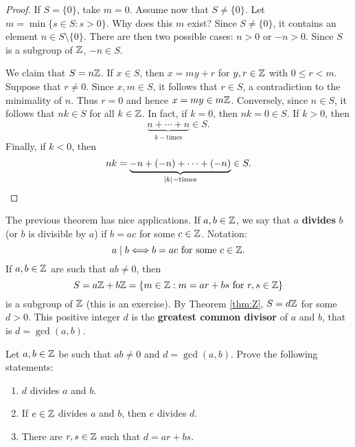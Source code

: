         \begin{proof}
                If $S=\{0\}$, take $m=0$. 
                Assume now that $S\ne\{0\}$. Let 
                $m=\min\{s\in S:s>0\}$. 
                Why does this $m$ exist?  
                Since $S\ne\{0\}$,  
                it contains 
                an element $n\in S\setminus\{0\}$. 
                There are then two possible cases: 
                $n>0$ or $-n>0$. Since 
                $S$ is a subgroup of $\mathbb{Z}$, $-n\in S$.
        
                We claim that $S=n\mathbb{Z}$.
                If $x\in S$, then $x=my+r$ for $y,r\in\mathbb{Z}$ with 
                $0\leq r<m$. Suppose that $r\ne 0$. Since $x,m\in S$, it follows that 
                $r\in S$,
                a contradiction to the minimality of $n$. Thus $r=0$ 
                and hence $x=my\in
                m\mathbb{Z}$. Conversely, since $n\in S$, it follows that
                 $nk\in S$ for all $k\in\mathbb{Z}$. In fact, if $k=0$, then 
                 $nk=0\in S$. If $k>0$, 
                 then 
                \[
                \underbrace{n+\cdots+n}_{k-\text{times}}\in S.
                \]
                Finally, if $k<0$, 
                then 
                \[
                nk=\underbrace{-n+(-n)+\cdots+(-n)}_{|k|-\text{times}}\in S.\qedhere
                \]
        \end{proof}

The previous theorem has nice applications. 
If $a,b\in\mathbb{Z}$, we say that $a$ \textbf{divides} $b$ (or $b$ is divisible by $a$)
if $b=ac$ for some $c\in\mathbb{Z}$. Notation: 
\[
a\mid b\Longleftrightarrow b=ac\text{ for some $c\in\mathbb{Z}$.}
\]
If $a,b\in\mathbb{Z}$ are such that $ab\ne0$, then 
\[
S=a\mathbb{Z}+b\mathbb{Z}=\{m\in\mathbb{Z}:m=ar+bs\text{ for $r,s\in\mathbb{Z}$}\}
\]
is a subgroup of $\mathbb{Z}$ (this is an exercise). 
By Theorem \ref{thm:Z}, $S=d\mathbb{Z}$ for some $d>0$. 
This positive integer $d$
is the \textbf{greatest common divisor} of $a$ and $b$, 
that is $d=\gcd(a,b)$. 

\begin{exercise}
Let $a,b\in\mathbb{Z}$ be such that $ab\ne0$ and $d=\gcd(a,b)$. 
Prove the following statements:
\begin{enumerate}
\item $d$ divides $a$ and $b$.
\item If $e\in\mathbb{Z}$ divides $a$ and $b$, then $e$ divides $d$.
\item There are $r,s\in\mathbb{Z}$ such that $d=ar+bs$.
\end{enumerate}
\end{exercise}

